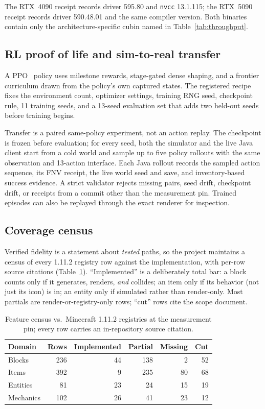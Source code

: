 \documentclass[11pt]{article}
\begin{document}
The RTX~4090 receipt records driver 595.80 and \texttt{nvcc} 13.1.115; the RTX~5090 receipt records driver 590.48.01 and the same compiler version. Both binaries contain only the architecture-specific cubin named in Table~\ref{tab:throughput}.

\subsection{RL proof of life and sim-to-real transfer}

A PPO~\citep{schulman2017ppo} policy uses milestone rewards, stage-gated dense shaping, and a frontier curriculum drawn from the policy's own captured states. The registered recipe fixes the environment count, optimizer settings, training RNG seed, checkpoint rule, 11 training seeds, and a 13-seed evaluation set that adds two held-out seeds before training begins.

Transfer is a paired same-policy experiment, not an action replay. The checkpoint is frozen before evaluation; for every seed, both the simulator and the live Java client start from a cold world and sample up to five policy rollouts with the same observation and 13-action interface. Each Java rollout records the sampled action sequence, its FNV receipt, the live world seed and save, and inventory-based success evidence. A strict validator rejects missing pairs, seed drift, checkpoint drift, or receipts from a commit other than the measurement pin. Trained episodes can also be replayed through the exact renderer for inspection.

\subsection{Coverage census}

Verified fidelity is a statement about \emph{tested} paths, so the project maintains a census of every 1.11.2 registry row against the implementation, with per-row source citations (Table~\ref{tab:census}). ``Implemented'' is a deliberately total bar: a block counts only if it generates, renders, \emph{and} collides; an item only if its behavior (not just its icon) is in; an entity only if simulated rather than render-only. Most partials are render-or-registry-only rows; ``cut'' rows cite the scope document.

\begin{table}[t]
\centering
\caption{Feature census vs.\ Minecraft 1.11.2 registries at the measurement pin; every row carries an in-repository source citation.}
\label{tab:census}
\begin{tabular}{lrrrrr}
\toprule
Domain & Rows & Implemented & Partial & Missing & Cut \\
\midrule
Blocks    & 236 & 44 & 138 & 2  & 52 \\
Items     & 392 & 9  & 235 & 80 & 68 \\
Entities  & 81  & 23 & 24  & 15 & 19 \\
Mechanics & 102 & 26 & 41  & 23 & 12 \\
\bottomrule
\end{tabular}
\end{table}
\end{document}
